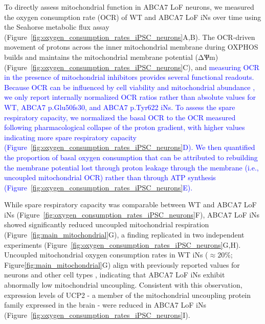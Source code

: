 To directly assess mitochondrial function in ABCA7 LoF neurons, we measured the oxygen consumption rate (OCR) of WT and ABCA7 LoF iNs over time using the Seahorse metabolic flux assay (Figure~\ref{fig:oxygen_consumption_rates_iPSC_neurons}A,B). The OCR-driven movement of protons across the inner mitochondrial membrane during OXPHOS builds and maintains the mitochondrial membrane potential (ΔѰm)(Figure~\ref{fig:oxygen_consumption_rates_iPSC_neurons}C), and  \newcommand{\quoteC}{\textcolor{blue}{measuring OCR in the presence of mitochondrial inhibitors provides several functional readouts. Because OCR can be influenced by cell viability and mitochondrial abundance \cite{Divakaruni2014-eq,Gu2021-ms}, we only report internally normalized OCR ratios rather than absolute values \cite{Divakaruni2022-bp} for WT, ABCA7 p.Glu50fs30, and ABCA7 p.Tyr622 iNs. To assess the spare respiratory capacity, we normalized the basal OCR to the OCR measured following pharmacological collapse of the proton gradient, with higher values indicating more spare respiratory capacity \cite{Divakaruni2022-bp} (Figure~\ref{fig:oxygen_consumption_rates_iPSC_neurons}D). We then quantified the proportion of basal oxygen consumption that can be attributed to rebuilding the membrane potential lost through proton leakage through the membrane (i.e., uncoupled mitochondrial OCR) rather than through ATP synthesis \cite{Divakaruni2022-bp} (Figure~\ref{fig:oxygen_consumption_rates_iPSC_neurons}E).\label{quoteC-label}}}
\quoteC

While spare respiratory capacity was comparable between WT and ABCA7 LoF iNs (Figure~\ref{fig:oxygen_consumption_rates_iPSC_neurons}F), ABCA7 LoF iNs showed significantly reduced uncoupled mitochondrial respiration (Figure~\ref{fig:main_mitochondrial}G), a finding replicated in two independent experiments (Figure~\ref{fig:oxygen_consumption_rates_iPSC_neurons}G,H). Uncoupled mitochondrial oxygen consumption rates in WT iNs ($\approx 20\%$; Figure\ref{fig:main_mitochondrial}G) align with previously reported values for neurons and other cell types \cite{Divakaruni2011-uj,Jekabsons2004-fn,Jain2024-br}, indicating that ABCA7 LoF iNs exhibit abnormally low mitochondrial uncoupling. Consistent with this observation, expression levels of UCP2 - a member of the mitochondrial uncoupling protein family expressed in the brain \cite{Kumar2022-bb}- were reduced in ABCA7 LoF iNs (Figure~\ref{fig:oxygen_consumption_rates_iPSC_neurons}I). 

